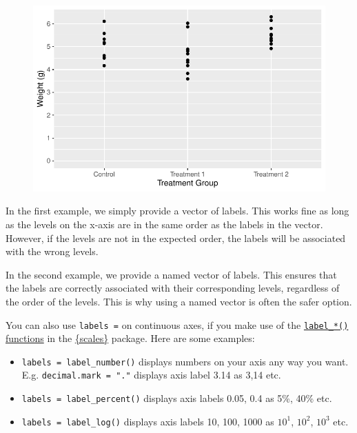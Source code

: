 \documentclass[
  letterpaper,
  DIV=11,
  numbers=noendperiod]{scrartcl}
\providecommand{\tightlist}{%
  \setlength{\itemsep}{0pt}\setlength{\parskip}{0pt}}\usepackage{longtable,booktabs,array}
\begin{document}
\begin{figure}[H]

{\centering \includegraphics{ggplot2intro_files/figure-pdf/unnamed-chunk-13-1.pdf}

}

\end{figure}

In the first example, we simply provide a vector of labels. This works
fine as long as the levels on the x-axis are in the same order as the
labels in the vector. However, if the levels are not in the expected
order, the labels will be associated with the wrong levels.

In the second example, we provide a named vector of labels. This ensures
that the labels are correctly associated with their corresponding
levels, regardless of the order of the levels. This is why using a named
vector is often the safer option.

\begin{tcolorbox}[enhanced jigsaw, left=2mm, title=\textcolor{quarto-callout-tip-color}{\faLightbulb}\hspace{0.5em}{Tip}, toprule=.15mm, colback=white, coltitle=black, opacityback=0, breakable, titlerule=0mm, bottomtitle=1mm, toptitle=1mm, colbacktitle=quarto-callout-tip-color!10!white, arc=.35mm, rightrule=.15mm, bottomrule=.15mm, leftrule=.75mm, colframe=quarto-callout-tip-color-frame, opacitybacktitle=0.6]

You can also use \texttt{labels\ =} on continuous axes, if you make use
of the
\href{https://scales.r-lib.org/reference/index.html\#axis-labels}{\texttt{label\_*()}
functions} in the \href{https://scales.r-lib.org/index.html}{\{scales\}}
package. Here are some examples:

\begin{itemize}
\tightlist
\item
  \texttt{labels\ =\ label\_number()} displays numbers on your axis any
  way you want. E.g. \texttt{decimal.mark\ =\ "."} displays axis label
  3.14 as 3,14 etc.
\item
  \texttt{labels\ =\ label\_percent()} displays axis labels 0.05, 0.4 as
  5\%, 40\% etc.
\item
  \texttt{labels\ =\ label\_log()} displays axis labels 10, 100, 1000 as
  \(10^1\), \(10^2\), \(10^3\) etc.
\end{itemize}

\end{tcolorbox}
\end{document}

